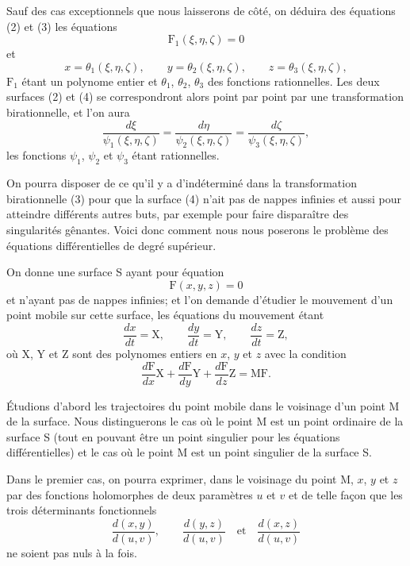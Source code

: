 \documentclass[11pt]{article}
\begin{document}
Sauf des cas exceptionnels que nous laisserons de côté, on déduira des équations (2) et (3) les équations
\begin{equation}\tag{4}
\mathrm{F}_1(\xi,\eta,\zeta)=0
\end{equation}
et
\begin{equation}\tag{5}
x=\theta_1(\xi,\eta,\zeta),\qquad
y=\theta_2(\xi,\eta,\zeta),\qquad
z=\theta_3(\xi,\eta,\zeta),
\end{equation}
$\mathrm{F}_1$ étant un polynome entier et $\theta_1$, $\theta_2$, $\theta_3$ des fonctions rationnelles. Les deux surfaces (2) et (4) se correspondront alors point par point par une transformation birationnelle, et l’on aura
\[
\frac{d\xi}{\psi_1(\xi,\eta,\zeta)}
=
\frac{d\eta}{\psi_2(\xi,\eta,\zeta)}
=
\frac{d\zeta}{\psi_3(\xi,\eta,\zeta)},
\]
les fonctions $\psi_1$, $\psi_2$ et $\psi_3$ étant rationnelles.

On pourra disposer de ce qu’il y a d’indéterminé dans la transformation birationnelle (3) pour que la surface (4) n’ait pas de nappes infinies et aussi pour atteindre différents autres buts, par exemple pour faire disparaître des singularités gênantes. Voici donc comment nous nous poserons le problème des équations différentielles de degré supérieur.

On donne une surface S ayant pour équation
\[
\mathrm{F}(x,y,z)=0
\]
et n’ayant pas de nappes infinies; et l’on demande d’étudier le mouvement d’un point mobile sur cette surface, les équations du mouvement étant
\[
\frac{dx}{dt}=\mathrm{X},
\qquad
\frac{dy}{dt}=\mathrm{Y},
\qquad
\frac{dz}{dt}=\mathrm{Z},
\]
où X, Y et Z sont des polynomes entiers en $x$, $y$ et $z$ avec la condition
\[
\frac{d\mathrm{F}}{dx}\mathrm{X}+\frac{d\mathrm{F}}{dy}\mathrm{Y}+\frac{d\mathrm{F}}{dz}\mathrm{Z}=\mathrm{MF}.
\]

Étudions d’abord les trajectoires du point mobile dans le voisinage d’un point M de la surface. Nous distinguerons le cas où le point M est un point ordinaire de la surface S (tout en pouvant être un point singulier pour les équations différentielles) et le cas où le point M est un point singulier de la surface S.

Dans le premier cas, on pourra exprimer, dans le voisinage du point M, $x$, $y$ et $z$ par des fonctions holomorphes de deux paramètres $u$ et $v$ et de telle façon que les trois déterminants fonctionnels
\[
\frac{d(x,y)}{d(u,v)},
\qquad
\frac{d(y,z)}{d(u,v)}
\quad\text{et}\quad
\frac{d(x,z)}{d(u,v)}
\]
ne soient pas nuls à la fois.
\end{document}
